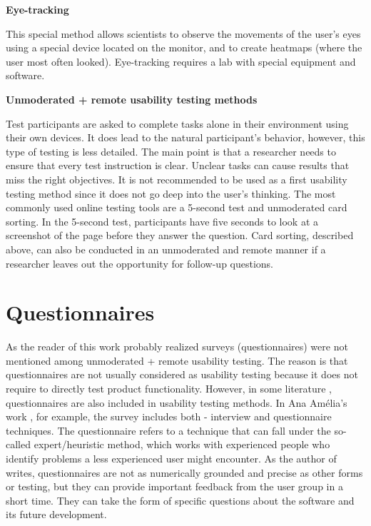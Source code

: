 \documentclass[a4paper,10pt,twoside]{article}
\begin{document}
\smallskip

\noindent \textbf {Eye-tracking}

\noindent This special method allows scientists to observe the
movements of the user's eyes using a special device located on the
monitor, and to create heatmaps (where the user most often
looked). Eye-tracking requires a lab with special equipment and
software.

\smallskip

\noindent \textbf {Unmoderated + remote usability testing methods}

\noindent Test participants are asked to complete tasks alone in their
environment using their own devices. It does lead to the natural
participant's behavior, however, this type of testing is less
detailed. The main point is that a researcher needs to ensure that
every test instruction is clear. Unclear tasks can cause results that
miss the right objectives. It is not recommended to be used as a first
usability testing method since it does not go deep into the user’s
thinking. The most commonly used online testing tools are a 5-second
test and unmoderated card sorting. In the 5-second test, participants
have five seconds to look at a screenshot of the page before they
answer the question. Card sorting, described above, can also be
conducted in an unmoderated and remote manner if a researcher leaves
out the opportunity for follow-up questions.

%

\newpage
\vspace*{-1cm}
\section{Questionnaires}
\label{sec:questionnaires}

\noindent As the reader of this work probably realized surveys
(questionnaires) were not mentioned among unmoderated + remote
usability testing. The reason is that questionnaires are not usually
considered as usability testing because it does not require to
directly test product functionality. However, in some literature
\cite{amelia} \cite{sixusability}, questionnaires are also included in
usability testing methods. In Ana Amélia's work \cite{amelia}, for
example, the survey includes both - interview and questionnaire
techniques. The questionnaire refers to a technique that can fall
under the so-called expert/heuristic method, which works with
experienced people who identify problems a less experienced user might
encounter. As the author of \cite{sixusability} writes, questionnaires
are not as numerically grounded and precise as other forms or testing,
but they can provide important feedback from the user group in a short
time. They can take the form of specific questions about the software
and its future development.
\end{document}
